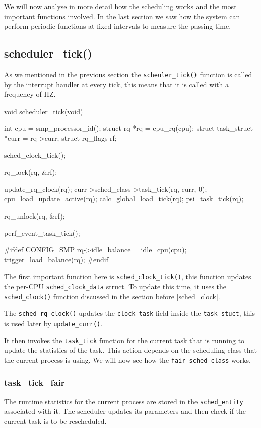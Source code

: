 \documentclass[10pt]{book}
\begin{document}
We will now analyse in more detail how the scheduling works and the most important functions involved. In the last section we saw how the system can perform periodic functions at fixed intervals to measure the passing time.

\subsection{scheduler\_tick()}

As we mentioned in the previous section the \verb|scheuler_tick()|  function is called by the interrupt handler at every tick, this means that it is called with a frequency of HZ.

\begin{code}
void scheduler_tick(void)
{
	int cpu = smp_processor_id();
	struct rq *rq = cpu_rq(cpu);
	struct task_struct *curr = rq->curr;
	struct rq_flags rf;

	sched_clock_tick();

	rq_lock(rq, &rf);

	update_rq_clock(rq);
	curr->sched_class->task_tick(rq, curr, 0);
	cpu_load_update_active(rq);
	calc_global_load_tick(rq);
	psi_task_tick(rq);

	rq_unlock(rq, &rf);

	perf_event_task_tick();

#ifdef CONFIG_SMP
	rq->idle_balance = idle_cpu(cpu);
	trigger_load_balance(rq);
#endif
}
\end{code}

The first important function here is \verb|sched_clock_tick()|, this function updates the per-CPU \verb|sched_clock_data| struct. To update this time, it uses the \verb|sched_clock()| function discussed in the section before \ref{sched_clock}.

The \verb|sched_rq_clock()| updates the \verb|clock_task| field inside the \verb|task_stuct|, this is used later by \verb|update_curr()|.

It then invokes the \verb|task_tick| function for the current task that is running to update the statistics of the task. This action depends on the scheduling class that the current process is using. We will now see how the \verb|fair_sched_class| works.

\subsubsection{task\_tick\_fair}

The runtime statistics for the current process are stored in the \verb|sched_entity| associated with it. The scheduler updates its parameters and then check if the current task is to be rescheduled. 
\end{document}
